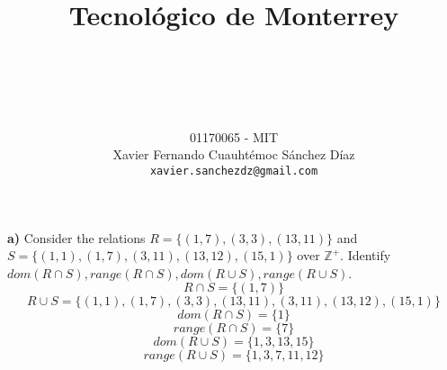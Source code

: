 \documentclass[titlepage, letterpaper, fleqn]{article}
\title{
\vspace{1in}
\textbf{Tecnológico de Monterrey} \\
\vspace{0.5in}
\textmd{\mahclass} \\
\large{\textit{\mahteacher}} \\
\vspace{0.5in}
\textsc{\mahtitle}
\author{01170065  - MIT \\
Xavier Fernando Cuauhtémoc Sánchez Díaz \\
\texttt{xavier.sanchezdz@gmail.com}}
\date{\mahdate}
}
\newcommand{\spacepls}{\vspace{5mm}}
\begin{document}
\begin{titlepage}
\maketitle
\end{titlepage}

%
%

{\large \textbf{a)} Consider the relations \(R = \{(1,7), (3,3), (13,11)\}\) and \(S = \{(1,1), (1,7), (3,11), (13,12), (15,1)\}\) over \(\mathbb{Z}^+\)}. Identify \(dom(R \cap S), range(R \cap S), dom(R \cup S), range(R \cup S)\).
\spacepls
\[R \cap S = \{(1,7)\}\]
\[R \cup S = \{(1,1), (1,7), (3,3), (13, 11), (3, 11), (13,12), (15,1)\}\]
\[dom(R \cap S) = \{1\}\]
\[range(R \cap S) = \{7\}\]
\[dom(R \cup S) = \{1, 3, 13, 15\}\]
\[range(R \cup S) = \{1, 3, 7, 11, 12\}\]
\end{document}
